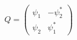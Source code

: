\begin{equation}
Q=\left( \begin{array}{cc}
\psi_1  & -\psi_2^* \\
\psi_2 & \psi_1^*
\end{array}  \right)
\end{equation}

